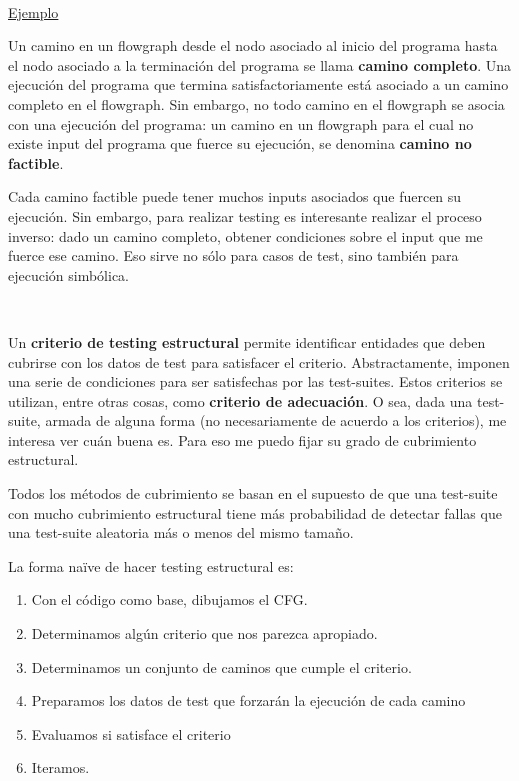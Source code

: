 \documentclass[]{article}
\begin{document}

~\newline

\underline{Ejemplo}

Un camino en un flowgraph desde el nodo asociado al inicio del programa hasta el nodo asociado a la terminación del programa se llama \textbf{camino completo}. Una ejecución del programa que termina satisfactoriamente está asociado a un camino completo en el flowgraph. Sin embargo, no todo camino en el flowgraph se asocia con una ejecución del programa: un camino en un flowgraph para el cual no existe input del programa que fuerce su ejecución, se denomina \textbf{camino no factible}.

Cada camino factible puede tener muchos inputs asociados que fuercen su ejecución. Sin embargo, para realizar testing es interesante realizar el proceso inverso: dado un camino completo, obtener condiciones sobre el input que me fuerce ese camino. Eso sirve no sólo para casos de test, sino también para ejecución simbólica.

~\newline

Un \textbf{criterio de testing estructural} permite identificar entidades que deben cubrirse con los datos de test para satisfacer el criterio. Abstractamente, imponen una serie de condiciones para ser satisfechas por las test-suites. Estos criterios se utilizan, entre otras cosas, como \textbf{criterio de adecuación}. O sea, dada una test-suite, armada de alguna forma (no necesariamente de acuerdo a los criterios), me interesa ver cuán buena es. Para eso me puedo fijar su grado de cubrimiento estructural.

Todos los métodos de cubrimiento se basan en el supuesto de que una test-suite con mucho cubrimiento estructural tiene más probabilidad de detectar fallas que una test-suite aleatoria más o menos del mismo tamaño.


La forma naïve de hacer testing estructural es:
\begin{enumerate}
	\item Con el código como base, dibujamos el CFG.
	\item Determinamos algún criterio que nos parezca apropiado.
	\item Determinamos un conjunto de caminos que cumple el criterio.
	\item Preparamos los datos de test que forzarán la ejecución de cada camino
	\item Evaluamos si satisface el criterio
	\item Iteramos.
\end{enumerate}
\end{document}
